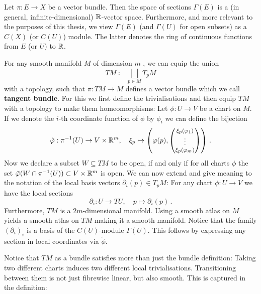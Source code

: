 \begin{remark}
	Let $\pi:E\to X$ be a vector bundle. Then the space of sections $\Gamma(E)$ is a (in general, infinite-dimensional) $\mathbb{R}$-vector space. Furthermore, and more relevant to the purposes of this thesis, we view $\Gamma(E)$ (and $\Gamma(U)$ for open subsets) as a $C(X)$ (or $C(U)$) module.  The latter denotes the ring of continuous functions from $E$ (or $U$) to $\mathbb{R}$. 
\end{remark}

\begin{example}
	For any smooth manifold $M$ of dimension $m$ , we can equip the union 
	\begin{equation*}
		TM\coloneq \bigsqcup_{p\in M} T_pM
	\end{equation*} with a topology, such that $\pi: TM\to M$ defines a vector bundle which we call \textbf{tangent bundle}. For this we first define the trivialisations and then equip $TM$ with a topology to make them homeomorphisms: Let $\phi:U\to V$ be a chart on $M$. If we denote the $i$-th coordinate function of $\phi$ by $\phi_i$ we can define the bijection \begin{equation*}
	\tilde{\varphi}:\pi^{-1}(U)\to V\times \mathbb{R}^m,\quad \xi_p\mapsto \left(\varphi(p),{\footnotesize
	\begin{pmatrix}
		\xi_p(\varphi_1)\\
		\vdots\\
		\xi_p(\varphi_m)
	\end{pmatrix}
	}\right)\,.
	\end{equation*} Now we declare a subset $W\subseteq TM$ to be open, if and only if for all charts $\phi$ the set $\tilde{\varphi}(W\cap \pi^{-1}(U)) \subset V\times \mathbb{R}^m$ is open.
	We can now extend and give meaning to the notation of the local basis vectors $\partial_i(p)\in T_pM$: For any chart $\phi:U\to V$ we have the local sections 
	\begin{equation*}
		\partial_i: U\to TU,\quad p\mapsto \partial_i(p)\,.
	\end{equation*}
	Furthermore, $TM$ is a $2m$-dimensional manifold. Using a smooth atlas on $M$ yields a smooth atlas on $TM$ making it a smooth manifold.
	Notice that the family $\left(\partial_i\right)_i$ is a basis of the $C(U)$-module $\Gamma(U)$. This follows by expressing any section in local coordinates via $\tilde{\phi}$.
\end{example}
Notice that $TM$ as a bundle satisfies more than just the bundle definition: Taking two different charts induces two different local trivialisations. Transitioning between them is not just fibrewise linear, but also smooth. This is captured in the definition:

